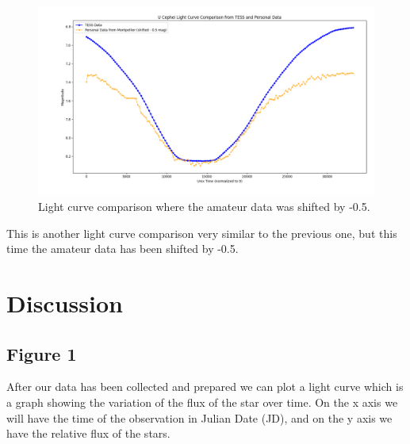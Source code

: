 \documentclass[12pt,a4paper]{article}
\begin{document}
\begin{figure}[H]
    \centering
    \includegraphics[width=1\textwidth]{assets/shifted-comparison.png}
    \caption{Light curve comparison where the amateur data was shifted by -0.5.}
  \label{fig:tess-data-comparison-shifted}
\end{figure}

This is another light curve comparison very similar to the previous one, but this time the amateur data has been shifted by -0.5. 


\section{Discussion}

\subsection{Figure 1}

After our data has been collected and prepared we can plot a light curve which is a graph showing the variation of the flux of the star over time.
On the x axis we will have the time of the observation in Julian Date (JD), and on the y axis we have the relative flux of the stars.
\end{document}
